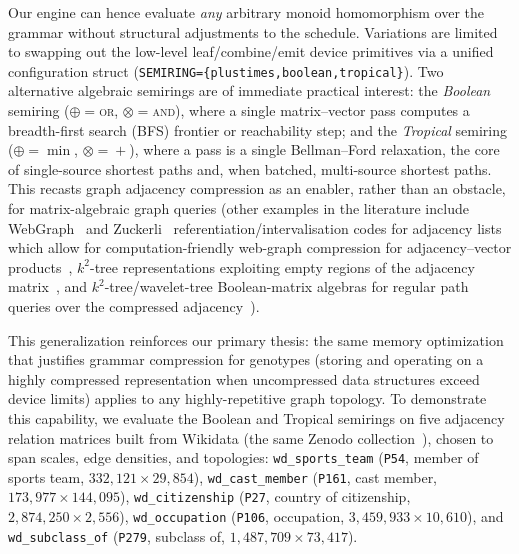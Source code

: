 \documentclass[twoside,leqno,twocolumn]{article}
\begin{document}
Our engine can hence evaluate \emph{any} arbitrary monoid homomorphism over the grammar without structural adjustments to the schedule. Variations are limited to swapping out the low-level leaf/combine/emit device primitives via a unified configuration struct (\texttt{SEMIRING=\{plustimes,boolean,tropical\}}). Two alternative algebraic semirings are of immediate practical interest: the \emph{Boolean} semiring ($\oplus={}$\textsc{or}, $\otimes={}$\textsc{and}), where a single matrix--vector pass computes a breadth-first search (BFS) frontier or reachability step; and the \emph{Tropical} semiring ($\oplus=\min$, $\otimes={}+$), where a pass is a single Bellman--Ford relaxation, the core of single-source shortest paths and, when batched, multi-source shortest paths. This recasts graph adjacency compression as an enabler, rather than an obstacle, for matrix-algebraic graph queries (other examples in the literature include WebGraph~\cite{webgraph,webgraph_rust} and Zuckerli~\cite{zuckerli} referentiation/intervalisation codes for adjacency lists which allow for computation-friendly web-graph compression for adjacency--vector products~\cite{francisco2022friendly,greener}, $k^2$-tree representations exploiting empty regions of the adjacency matrix~\cite{k2tree-spire}\cite[\S9.2.1]{navarro_book}, and $k^2$-tree/wavelet-tree Boolean-matrix algebras for regular path queries over the compressed adjacency~\cite{rpq-k2tree-vldbj,rpq-compact-vldbj,time-space-rpq,arroyuelo2026boosting}).

This generalization reinforces our primary thesis: the same memory optimization that justifies grammar compression for genotypes (storing and operating on a highly compressed representation when uncompressed data structures exceed device limits) applies to any highly-repetitive graph topology. To demonstrate this capability, we evaluate the Boolean and Tropical semirings on five adjacency relation matrices built from Wikidata (the same Zenodo collection~\cite{time-space-rpq}), chosen to span scales, edge densities, and topologies: \texttt{wd\_sports\_team} (\texttt{P54}, member of sports team, $332{,}121 \times 29{,}854$), \texttt{wd\_cast\_member} (\texttt{P161}, cast member, $173{,}977 \times 144{,}095$), \texttt{wd\_citizenship} (\texttt{P27}, country of citizenship, $2{,}874{,}250 \times 2{,}556$), \texttt{wd\_occupation} (\texttt{P106}, occupation, $3{,}459{,}933 \times 10{,}610$), and \texttt{wd\_subclass\_of} (\texttt{P279}, subclass of, $1{,}487{,}709 \times 73{,}417$). 
\end{document}
